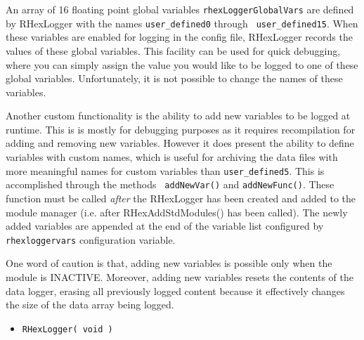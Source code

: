 An array of 16 floating point global variables {\tt rhexLoggerGlobalVars}
are defined by RHexLogger with the names {\tt user\_defined0} through {\tt
user\_defined15}. When these variables are enabled for logging in the config
file, RHexLogger records the values of these global variables. This facility
can be used for quick debugging, where you can simply assign the value you
would like to be logged to one of these global variables. Unfortunately, it
is not possible to change the names of these variables.

Another custom functionality is the ability to add new variables to be
logged at runtime. This is is mostly for debugging purposes as it requires
recompilation for adding and removing new variables. However it does present
the ability to define variables with custom names, which is useful for
archiving the data files with more meaningful names for custom variables
than {\tt user\_defined5}. This is accomplished through the methods {\tt
  addNewVar()} and {\tt addNewFunc()}. These function must be called {\em
  after} the RHexLogger has been created and added to the module manager
(i.e. after RHexAddStdModules() has been called). The newly added variables
are appended at the end of the variable list configured by {\tt
  rhexloggervars} configuration variable.

One word of caution is that, adding new variables is possible only when the
module is INACTIVE. Moreover, adding new variables resets the contents of
the data logger, erasing all previously logged content because it
effectively changes the size of the data array being logged.

\constructors

\begin{itemize}
\item{\tt RHexLogger( void )}\par
\end{itemize}

\localinterface

